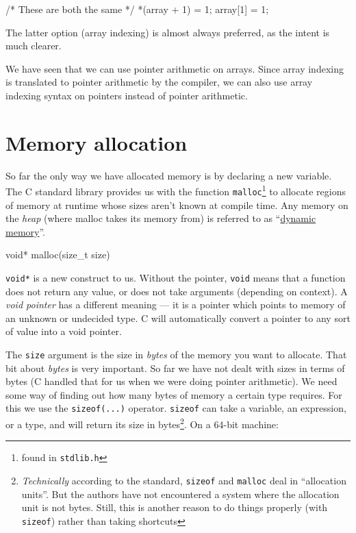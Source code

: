 \begin{codeblock}
/* These are both the same */
*(array + 1) = 1;
array[1] = 1; 
\end{codeblock}

The latter option (array indexing) is almost always preferred, as the intent is much clearer.

We have seen that we can use pointer arithmetic on arrays.
Since array indexing is translated to pointer arithmetic by the compiler, we can also use array indexing syntax on pointers instead of pointer arithmetic.

\section{Memory allocation}

So far the only way we have allocated memory is by declaring a new variable.
The C standard library provides us with the function \lstinline!malloc!\footnote{found in \lstinline{stdlib.h}} to allocate regions of memory at 
runtime whose sizes aren't known at compile time.
Any memory on the \emph{heap} (where malloc takes its memory from) is referred to as ``\hyperlink{defn:dynamicmemory}{dynamic memory}''.

\begin{codeinline}
void* malloc(size_t size)
\end{codeinline}

\lstinline!void*! is a new construct to us.
Without the pointer, \lstinline!void! means that a function does not return any value, or does not take arguments (depending on context).
A \emph{void pointer} has a different meaning --- it is a pointer which points to memory of an unknown or undecided type.
C will automatically convert a pointer to any sort of value into a void pointer.

The \texttt{size} argument is the size in \emph{bytes} of the memory you want to allocate.
That bit about \emph{bytes} is very important.
So far we have not dealt with sizes in terms of bytes (C handled that for us when we were doing pointer arithmetic).
We need some way of finding out how many bytes of memory a certain type requires.
For this we use the \lstinline!sizeof(...)! operator.
\lstinline!sizeof! can take a variable, an expression, or a type, and will return its size in bytes\footnote{\emph{Technically} according to the standard, \lstinline!sizeof!
and \lstinline!malloc! deal in ``allocation units''. But the authors have not encountered a system where the allocation unit is not bytes.
Still, this is another reason to do things properly (with \lstinline!sizeof!) rather than taking shortcuts}.
On a 64-bit machine:

